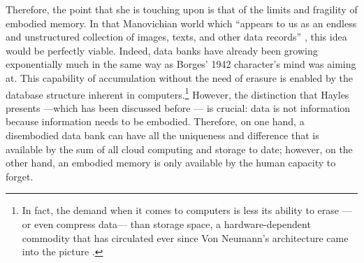 Therefore, the point that she is touching upon is that of the limits and fragility of embodied memory. In that Manovichian world which ``appears to us as an endless and unstructured collection of images, texts, and other data records'' \parencite[219]{Man01:The}, this idea would be perfectly viable. Indeed, data banks have already been growing exponentially much in the same way as Borges' 1942 character's mind was aiming at. This capability of accumulation without the need of erasure is enabled by the database structure inherent in computers.\footnote{In fact, the demand when it comes to computers is less its ability to erase ---or even compress data--- than storage space, a hardware-dependent commodity that has circulated ever since Von Neumann's architecture came into the picture .} However, the distinction that Hayles presents ---which has been discussed before --- is crucial: data is not information because information needs to be embodied. Therefore, on one hand, a disembodied data bank can have all the uniqueness and difference that is available by the sum of all cloud computing and storage to date; however, on the other hand, an embodied memory is only available by the human capacity to forget. 

